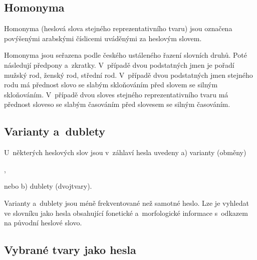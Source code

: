 \subsection*{Homonyma}

Homonyma (heslová slova stejného reprezentativního tvaru) jsou označena povýšenými arabskými číslicemi uváděnými za heslovým slovem.

\blspace
  \dicEntry {}  
  \dicEntry {}  
\blspace

Homonyma jsou seřazena podle českého ustáleného řazení slovních druhů. Poté následují předpony a~zkratky.
V~případě dvou podstatných jmen je pořadí mužský rod, ženský rod, střední rod. V~případě dvou podstatných jmen stejného rodu má přednost slovo se slabým skloňováním před slovem se silným skloňováním. V~případě dvou sloves stejného reprezentativního tvaru má přednost sloveso se slabým časováním před slovesem se silným časováním.

\subsection*{Varianty a~dublety}

U~některých heslových slov jsou v~záhlaví hesla uvedeny a) varianty (obměny)

\blspace
  \dicEntry {},  
\blspace

nebo b) dublety (dvojtvary).

\blspace
  \dicEntry {} 
\blspace

Varianty a~dublety jsou méně frekventované než samotné heslo. Lze je vyhledat ve slovníku jako hesla obsahující fonetické a~morfologické informace s~odkazem na původní heslové slovo.

\blspace
  \dicEntry {}    
  \dicEntry {}    
\blspace

\subsection*{Vybrané tvary jako hesla}

